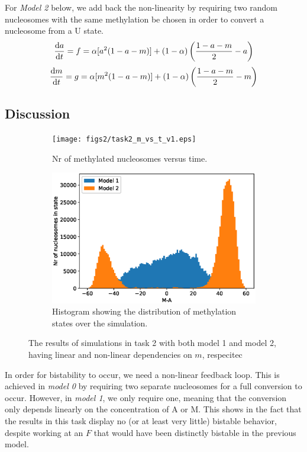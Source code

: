 \documentclass{article}
\begin{document}
For \textit{Model 2} below, we add back the non-linearity by requiring two random nucleosomes with the same methylation be chosen in order to convert a nucleosome from a U state.
\begin{equation}
	\dv {a}{t} = f = \alpha[a^2(1-a-m)] + (1-\alpha )\left(\frac{1-a-m}{2}  - a\right)
\end{equation}
\begin{equation}
	\dv {m}{t} = g = \alpha[m^2(1-a-m)] + (1-\alpha )\left(\frac{1-a-m}{2}  - m\right)
\end{equation}


\subsection{Discussion}
\begin{figure}[H]
	\centering
	\begin{subfigure}[b]{.49\textwidth}
		\centering
		\texttt{[image: figs2/task2\_m\_vs\_t\_v1.eps]}
		\caption{Nr of methylated nucleosomes versus time.\\ }
		\label{fig:task2_m_vs_t}
	\end{subfigure}
	\begin{subfigure}[b]{.49\textwidth}
		\centering
		\includegraphics[width= \linewidth]{figs2/task2_hist_v1.eps}
		\caption{Histogram showing the distribution of methylation states over the simulation.}
		\label{fig:task2_hist}
	\end{subfigure}
		\caption{The results of simulations in task 2 with both model 1 and model 2, having linear and non-linear dependencies on $m$, respecitec}
		\label{fig:task2}
\end{figure}

In order for bistability to occur, we need a non-linear feedback loop. This is achieved in \textit{model 0} by requiring two separate nucleosomes for a full conversion to occur. However, in \textit{model 1}, we only require one, meaning that the conversion only depends linearly on the concentration of A or M. This shows in the fact that the results in this task display no (or at least very little) bistable behavior, despite working at an $F$ that would have been distinctly bistable in the previous model. 
\end{document}
